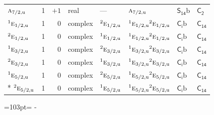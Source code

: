 \documentclass[10pt,a4paper]{article}
\newcommand{\needspace}[1]{\par\penalty-100\begingroup\dimen0=#1\relax\dimen2=\pagegoal
  \advance\dimen2-\pagetotal\ifdim\dimen0>\dimen2\relax\ifdim\dimen2>0pt\vfil\break\fi\fi
  \endgroup}
\numberwithin{equation}{section}
\newcommand{\grp}[1]{\mathsf{#1}}
\newcommand{\irr}[1]{\text{\normalfont\scshape #1}}
\newcommand{\conjpair}[1]{{}^{#1}}
\newcommand{\ptag}[1]{\mathrm{#1}}
\newcommand{\secondclass}{\mathrm{b}}
\begin{document}
{\begin{longtable}{@{}lrrlllll@{}}
$\irr{a}_{7/2,\ptag{u}}$ & 1 & $+1$ & real & --- & $\irr{a}_{7/2,\ptag{u}}$ & \href{S14b.pdf}{$\grp{S_{14}}\secondclass$} & \href{../../../rotation/data/pdf/C2.pdf}{$\grp{C_{2}}$}\\
$\conjpair{1}\irr{e}_{1/2,\ptag{u}}$ & 1 & $0$ & complex & $\conjpair{2}\irr{e}_{1/2,\ptag{u}}$ & $\conjpair{1}\irr{e}_{1/2,\ptag{u}}\conjpair{2}\irr{e}_{1/2,\ptag{u}}$ & \href{S2b.pdf}{$\grp{C_{i}}\secondclass$} & $\grp{C_{14}}$\\
$\conjpair{2}\irr{e}_{1/2,\ptag{u}}$ & 1 & $0$ & complex & $\conjpair{1}\irr{e}_{1/2,\ptag{u}}$ & $\conjpair{1}\irr{e}_{1/2,\ptag{u}}\conjpair{2}\irr{e}_{1/2,\ptag{u}}$ & \href{S2b.pdf}{$\grp{C_{i}}\secondclass$} & $\grp{C_{14}}$\\
$\conjpair{1}\irr{e}_{3/2,\ptag{u}}$ & 1 & $0$ & complex & $\conjpair{2}\irr{e}_{3/2,\ptag{u}}$ & $\conjpair{1}\irr{e}_{3/2,\ptag{u}}\conjpair{2}\irr{e}_{3/2,\ptag{u}}$ & \href{S2b.pdf}{$\grp{C_{i}}\secondclass$} & $\grp{C_{14}}$\\
$\conjpair{2}\irr{e}_{3/2,\ptag{u}}$ & 1 & $0$ & complex & $\conjpair{1}\irr{e}_{3/2,\ptag{u}}$ & $\conjpair{1}\irr{e}_{3/2,\ptag{u}}\conjpair{2}\irr{e}_{3/2,\ptag{u}}$ & \href{S2b.pdf}{$\grp{C_{i}}\secondclass$} & $\grp{C_{14}}$\\
$\conjpair{1}\irr{e}_{5/2,\ptag{u}}$ & 1 & $0$ & complex & $\conjpair{2}\irr{e}_{5/2,\ptag{u}}$ & $\conjpair{1}\irr{e}_{5/2,\ptag{u}}\conjpair{2}\irr{e}_{5/2,\ptag{u}}$ & \href{S2b.pdf}{$\grp{C_{i}}\secondclass$} & $\grp{C_{14}}$\\*
$\conjpair{2}\irr{e}_{5/2,\ptag{u}}$ & 1 & $0$ & complex & $\conjpair{1}\irr{e}_{5/2,\ptag{u}}$ & $\conjpair{1}\irr{e}_{5/2,\ptag{u}}\conjpair{2}\irr{e}_{5/2,\ptag{u}}$ & \href{S2b.pdf}{$\grp{C_{i}}\secondclass$} & $\grp{C_{14}}$\\
\bottomrule\end{longtable}}
\needspace{103pt}
\end{document}
